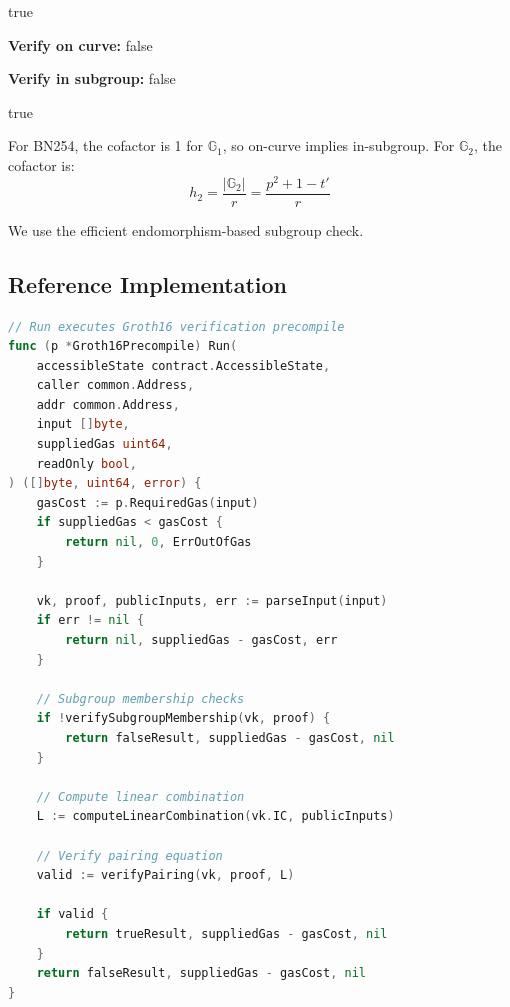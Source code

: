 \documentclass[11pt,a4paper]{article}
\theoremstyle{definition}
\begin{document}
\begin{algorithm}
\caption{Subgroup Membership Check}
\begin{algorithmic}[1]
        \State \Return true
    \EndIf

    \State \textbf{Verify on curve:}
        \State \Return false
    \EndIf

    \State \textbf{Verify in subgroup:}
        \State \Return false
    \EndIf

    \State \Return true
\EndFunction
\end{algorithmic}
\end{algorithm}

For BN254, the cofactor is 1 for $\mathbb{G}_1$, so on-curve implies in-subgroup. For $\mathbb{G}_2$, the cofactor is:
\[
h_2 = \frac{|\mathbb{G}_2|}{r} = \frac{p^2 + 1 - t'}{r}
\]

We use the efficient endomorphism-based subgroup check.

\subsection{Reference Implementation}

\begin{lstlisting}[language=Go, caption={Groth16 Verification Entry Point}]
// Run executes Groth16 verification precompile
func (p *Groth16Precompile) Run(
    accessibleState contract.AccessibleState,
    caller common.Address,
    addr common.Address,
    input []byte,
    suppliedGas uint64,
    readOnly bool,
) ([]byte, uint64, error) {
    gasCost := p.RequiredGas(input)
    if suppliedGas < gasCost {
        return nil, 0, ErrOutOfGas
    }

    vk, proof, publicInputs, err := parseInput(input)
    if err != nil {
        return nil, suppliedGas - gasCost, err
    }

    // Subgroup membership checks
    if !verifySubgroupMembership(vk, proof) {
        return falseResult, suppliedGas - gasCost, nil
    }

    // Compute linear combination
    L := computeLinearCombination(vk.IC, publicInputs)

    // Verify pairing equation
    valid := verifyPairing(vk, proof, L)

    if valid {
        return trueResult, suppliedGas - gasCost, nil
    }
    return falseResult, suppliedGas - gasCost, nil
}
\end{lstlisting}
\end{document}
